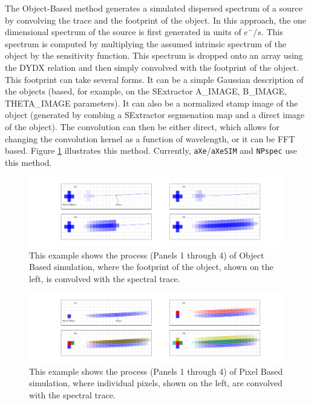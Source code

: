 \documentclass[12pt]{article}
\begin{document}
The Object-Based method generates a simulated dispersed spectrum of a source by convolving the trace and the footprint of the object. In this approach, the one dimensional spectrum of the source is first generated in units of $e^-/s$. This spectrum is computed by multiplying the assumed intrinsic spectrum of the object by the sensitivity function. This spectrum is dropped onto an array using the DYDX relation and then simply convolved with the footprint of the object. This footprint can take several forms. It can be a simple Gaussian description of the objects (based, for example, on the SExtractor A\_IMAGE, B\_IMAGE, THETA\_IMAGE parameters). It can also be a normalized stamp image of the object (generated by combing a SExtractor segmenation map and a direct image of the object). The convolution can then be either direct, which allows for changing the convolution kernel as a function of wavelength, or it can be FFT based.
Figure \ref{sim:1} illustrates this method. Currently, \texttt{aXe}/\texttt{aXeSIM} and \texttt{NPspec} use this method. 

\begin{figure}[!t]
\centering
\includegraphics[width=\textwidth]{"Figures/object_sim"}
\caption{This example shows the process (Panels 1 through 4) of Object Based simulation, where the footprint of the object, shown on the left, is convolved with the spectral trace.}
\label{sim:1}
\end{figure}

\begin{figure}[!t]
\centering
\includegraphics[width=\textwidth]{"Figures/pixel_sim"}
\caption{This example shows the process (Panels 1 through 4) of Pixel Based simulation, where individual pixels, shown on the left, are convolved with the spectral trace.}
\label{sim:2}
\end{figure}
\end{document}
